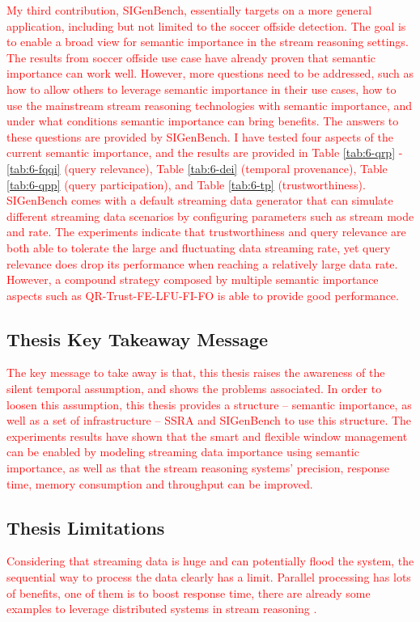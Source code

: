 \textcolor{red}{
My third contribution, SIGenBench, essentially targets on a more general application, including but not limited to the soccer offside detection. 
The goal is to enable a broad view for semantic importance in the stream reasoning settings. 
The results from soccer offside use case have already proven that semantic importance can work well. 
However, more questions need to be addressed, such as how to allow others to leverage semantic importance in their use cases, how to use the mainstream stream reasoning technologies with semantic importance, and under what conditions semantic importance can bring benefits. 
The answers to these questions are provided by SIGenBench. 
I have tested four aspects of the current semantic importance, and the results are provided in Table \ref{tab:6-qrp} - \ref{tab:6-fqqi} (query relevance), Table \ref{tab:6-dei} (temporal provenance), Table \ref{tab:6-qpp} (query participation), and Table \ref{tab:6-tp} (trustworthiness). 
SIGenBench comes with a default streaming data generator that can simulate different streaming data scenarios by configuring parameters such as stream mode and rate. 
The experiments indicate that trustworthiness and query relevance are both able to tolerate the large and fluctuating data streaming rate, yet query relevance does drop its performance when reaching a relatively large data rate. 
However, a compound strategy composed by multiple semantic importance aspects such as QR-Trust-FE-LFU-FI-FO is able to provide good performance.
}
%
\subsection{Thesis Key Takeaway Message}
\textcolor{red}{
The key message to take away is that, this thesis raises the awareness of the silent temporal assumption, and shows the problems associated. 
In order to loosen this assumption, this thesis provides a structure -- semantic importance, as well as a set of infrastructure -- SSRA and SIGenBench to use this structure. 
The experiments results have shown that the smart and flexible window management can be enabled by modeling streaming data importance using semantic importance, as well as that the stream reasoning systems' precision, response time, memory consumption and throughput can be improved.
}
%
\subsection{Thesis Limitations}
\textcolor{red}{
Considering that streaming data is huge and can potentially flood the system, the sequential way to process the data clearly has a limit. 
Parallel processing has lots of benefits, one of them is to boost response time, there are already some examples to leverage distributed systems in stream reasoning \cite{hoeksema2011high} \cite{liu2014efficient}. 
}

